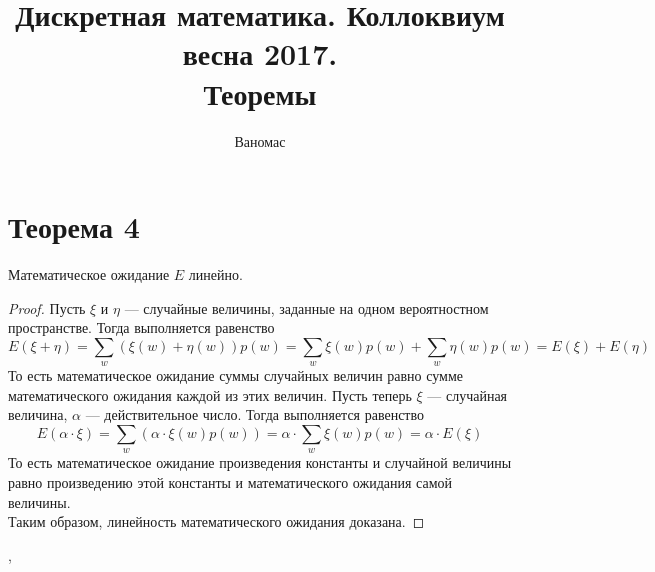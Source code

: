 \documentclass[a4paper,12pt]{article}
\begin{document}
	\title{Дискретная математика. Коллоквиум весна 2017. \\ Теоремы}
	\author{Ваномас}
	\maketitle
	\tableofcontents
    \pagebreak
	\section{Теорема 4}
	\begin{theorem}
		Математическое ожидание $E$ линейно.
	\end{theorem}
	\begin{proof}
	Пусть $\xi$ и $\eta$ --- случайные величины, заданные на одном вероятностном пространстве. Тогда выполняется равенство $$E(\xi+\eta)=\sum_w(\xi(w)+\eta(w))p(w)=\sum_w\xi(w)p(w)+\sum_w\eta(w)p(w)=E(\xi)+E(\eta)$$
	То есть математическое ожидание суммы случайных величин равно сумме математического ожидания каждой из этих величин. Пусть теперь $\xi$ --- случайная величина, $\alpha$ --- действительное число. Тогда выполняется равенство 
	$$E(\alpha\cdot\xi)=\sum_w(\alpha\cdot\xi(w)p(w))=\alpha\cdot\sum_w\xi(w)p(w)=\alpha\cdot E(\xi)$$
	То есть математическое ожидание произведения константы и случайной величины равно произведению этой константы и математического ожидания самой величины.\\
	Таким образом, линейность математического ожидания доказана.
	\end{proof}
    
    \sep
    
\end{document}
